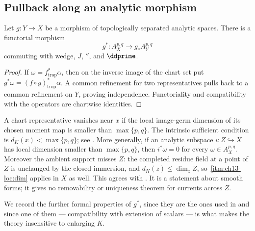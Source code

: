 \subsection{Pullback along an analytic morphism}
\label{sec:ch13-pullback}

\begin{proposition}\label{prop:cld-form-pullback}
Let $g:Y\to X$ be a morphism of topologically separated analytic spaces.
There is a functorial morphism
\[
                 g^*:A_X^{p,q}\longrightarrow g_*A_Y^{p,q}
\]
commuting with wedge, $J$, $\dprime$, and $\ddprime$.
\end{proposition}
\begin{proof}
If $\omega=f_{\mathrm{trop}}^*\alpha$, then on the inverse image of the
chart set put $g^*\omega=(f\circ g)_{\mathrm{trop}}^*\alpha$.  A common
refinement for two representatives pulls back to a common refinement on
$Y$, proving independence.  Functoriality and compatibility with the
operators are chartwise identities.
\end{proof}

\begin{remark}
\label{rem:ch13-vanishing-dimension}
A chart representative vanishes near $x$ if the local image-germ
dimension of its chosen moment map is smaller than $\max\{p,q\}$.
The intrinsic sufficient condition is $d_K(x)<\max\{p,q\}$; see
\cite[Proposition~15.2.1]{CLD25}.  More generally, if an analytic subspace
$i:Z\hookrightarrow X$ has local dimension smaller than $\max\{p,q\}$,
then $i^*\omega=0$ for every $\omega\in A_X^{p,q}$.  Moreover the ambient
support misses $Z$: the completed residue field at a point of $Z$ is
unchanged by the closed immersion, and $d_K(z)\le\dim_z Z$, so
\,\cref{itm:ch13-loc:dim} applies in $X$ as well.
This agrees with \cite[Proposition~15.2.1(b)]{CLD25}.  It is a statement
about smooth forms; it gives no removability or uniqueness theorem for
currents across $Z$.
\end{remark}

We record the further formal properties of $g^*$, since they are the ones
used in  and since one of
them --- compatibility with extension of scalars --- is what makes the theory
insensitive to enlarging $K$.

